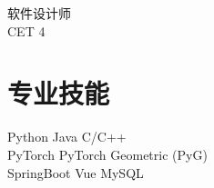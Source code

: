\documentclass[]{deedy-resume-openfont}
\begin{document}
\begin{minipage}[t]{0.3\textwidth}
\textbullet{} 软件设计师 \\
\textbullet{} CET 4 \\
\sectionsep




\section{专业技能}
\textbullet{} Python \textbullet{} Java \textbullet{}  C/C++\\
\textbullet{} PyTorch \textbullet{} PyTorch Geometric (PyG) \\
\textbullet{} SpringBoot \textbullet{} Vue \textbullet{} MySQL \\
\sectionsep

%
%

\end{minipage} 
\hfill
\end{document}
